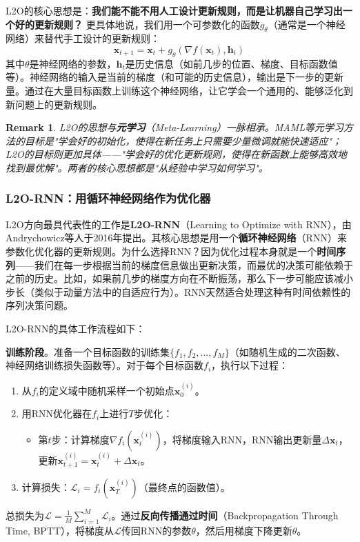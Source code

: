 \documentclass[lang=cn,zihao=-4,a4paper,fontset=windows]{beautybook}
\newtheorem*{remark}{\textbf{Remark}}
\begin{document}
L2O的核心思想是：\textbf{我们能不能不用人工设计更新规则，而是让机器自己学习出一个好的更新规则？} 更具体地说，我们用一个可参数化的函数$g_\theta$（通常是一个神经网络）来替代手工设计的更新规则：
\[
\mathbf{x}_{t+1} = \mathbf{x}_t + g_\theta(\nabla f(\mathbf{x}_t), \mathbf{h}_t)
\]
其中$\theta$是神经网络的参数，$\mathbf{h}_t$是历史信息（如前几步的位置、梯度、目标函数值等）。神经网络的输入是当前的梯度（和可能的历史信息），输出是下一步的更新量。通过在大量目标函数上训练这个神经网络，让它学会一个通用的、能够泛化到新问题上的更新规则。

\begin{remark}
L2O的思想与\textbf{元学习}（Meta-Learning）一脉相承。MAML等元学习方法的目标是"学会好的初始化，使得在新任务上只需要少量微调就能快速适应"；L2O的目标则更加具体——"学会好的优化更新规则，使得在新函数上能够高效地找到最优解"。两者的核心思想都是"从经验中学习如何学习"。
\end{remark}

\subsubsection{L2O-RNN：用循环神经网络作为优化器}

L2O方向最具代表性的工作是\textbf{L2O-RNN}（Learning to Optimize with RNN），由Andrychowicz等人于2016年提出。其核心思想是用一个\textbf{循环神经网络}（RNN）来参数化优化器的更新规则。为什么选择RNN？因为优化过程本身就是一个\textbf{时间序列}——我们在每一步根据当前的梯度信息做出更新决策，而最优的决策可能依赖于之前的历史。比如，如果前几步的梯度方向在不断振荡，那么下一步可能应该减小步长（类似于动量方法中的自适应行为）。RNN天然适合处理这种有时间依赖性的序列决策问题。

L2O-RNN的具体工作流程如下：

\textbf{训练阶段}。准备一个目标函数的训练集$\{f_1, f_2, \dots, f_M\}$（如随机生成的二次函数、神经网络训练损失函数等）。对于每个目标函数$f_i$，执行以下过程：
\begin{enumerate}
    \item 从$f_i$的定义域中随机采样一个初始点$\mathbf{x}_0^{(i)}$。
    \item 用RNN优化器在$f_i$上进行$T$步优化：
    \begin{itemize}
        \item 第$t$步：计算梯度$\nabla f_i(\mathbf{x}_t^{(i)})$，将梯度输入RNN，RNN输出更新量$\Delta \mathbf{x}_t$，更新$\mathbf{x}_{t+1}^{(i)} = \mathbf{x}_t^{(i)} + \Delta \mathbf{x}_t$。
    \end{itemize}
    \item 计算损失：$\mathcal{L}_i = f_i(\mathbf{x}_T^{(i)})$（最终点的函数值）。
\end{enumerate}
总损失为$\mathcal{L} = \frac{1}{M} \sum_{i=1}^{M} \mathcal{L}_i$。通过\textbf{反向传播通过时间}（Backpropagation Through Time, BPTT），将梯度从$\mathcal{L}$传回RNN的参数$\theta$，然后用梯度下降更新$\theta$。
\end{document}
